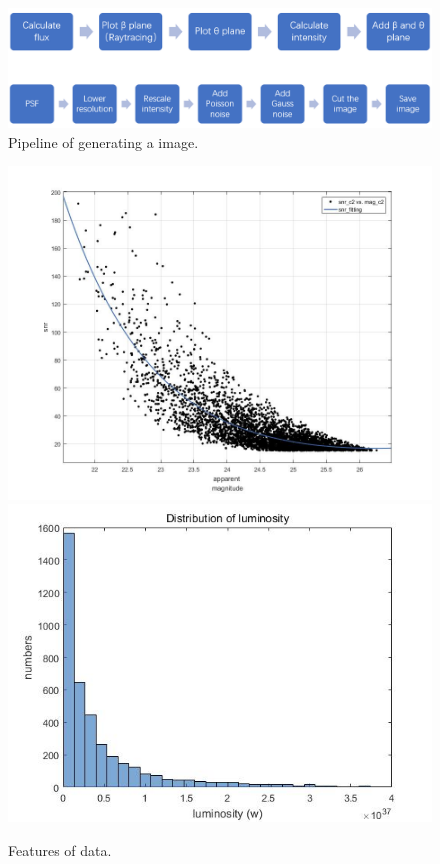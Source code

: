 \documentclass[a4paper,fleqn,usenatbib]{mnras}
\begin{document}
\begin{figure}
\centerline{
  \includegraphics[scale=0.3]{pipeline.png}}
  \caption{Pipeline of generating a image.}
\label{figPipeline}
\end{figure}

\begin{figure}
  \includegraphics[scale=0.12]{fitting_of_snr.jpg}
  \includegraphics[scale=0.23]{distribution_of_lum.jpg}
  \caption{Features of data.}
\label{figMagDistribution}
\end{figure}
\end{document}
